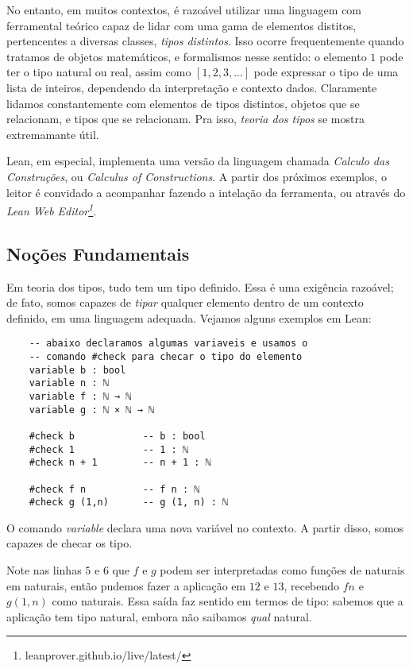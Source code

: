 No entanto, em muitos contextos, é razoável utilizar uma linguagem com ferramental teórico capaz de lidar com uma gama de elementos distitos, pertencentes a diversas classes, \textit{tipos distintos}.
Isso ocorre frequentemente quando tratamos de objetos matemáticos, e formalismos nesse sentido: o elemento $1$ pode ter o tipo natural ou real, assim como $[1,2,3, ...]$ pode expressar o tipo de uma lista de inteiros, dependendo da interpretação e contexto dados.
Claramente lidamos constantemente com elementos de tipos distintos, objetos que se relacionam, e tipos que se relacionam.
Pra isso, \textit{teoria dos tipos} se mostra extremamante útil.

Lean, em especial, implementa uma versão da linguagem chamada \textit{Calculo das Construções}, ou \textit{Calculus of Constructions}. A partir dos próximos exemplos, o leitor é convidado a acompanhar fazendo a intelação da ferramenta, ou através do \textit{Lean Web Editor\footnote{leanprover.github.io/live/latest/}}.

\subsection{Noções Fundamentais}
Em teoria dos tipos, tudo tem um tipo definido. Essa é uma exigência razoável; de fato, somos capazes de \textit{tipar} qualquer elemento dentro de um contexto definido, em uma linguagem adequada. Vejamos alguns exemplos em Lean:

\vspace{5mm}
\begin{lstlisting}
    -- abaixo declaramos algumas variaveis e usamos o
    -- comando #check para checar o tipo do elemento
    variable b : bool
    variable n : ℕ
    variable f : ℕ → ℕ
    variable g : ℕ × ℕ → ℕ

    #check b            -- b : bool
    #check 1            -- 1 : ℕ
    #check n + 1        -- n + 1 : ℕ

    #check f n          -- f n : ℕ
    #check g (1,n)      -- g (1, n) : ℕ
\end{lstlisting}
\vspace{5mm}

\noindent O comando \textit{variable} declara uma nova variável no contexto.
A partir disso, somos capazes de checar os tipo.

Note nas linhas $5$ e $6$ que $f$ e $g$ podem ser interpretadas como funções de naturais em naturais, então pudemos fazer a aplicação em $12$ e $13$, recebendo $f n$ e $g (1,n)$ como naturais.
Essa saída faz sentido em termos de tipo: sabemos que a aplicação tem tipo natural, embora não saibamos \textit{qual} natural.

